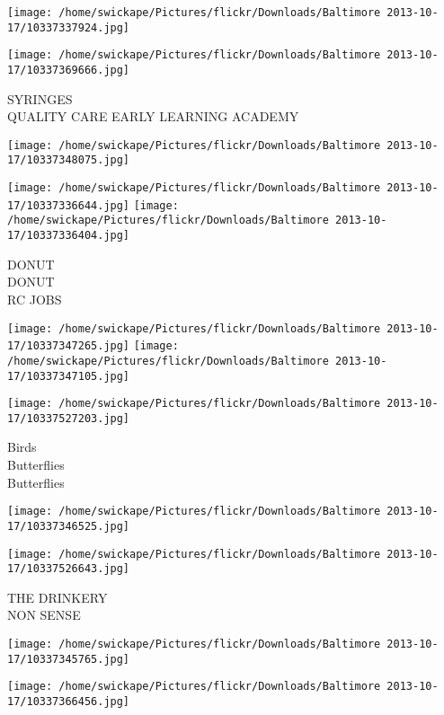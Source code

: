 \documentclass[10pt,letterpaper]{article}
\begin{document}
\texttt{[image: /home/swickape/Pictures/flickr/Downloads/Baltimore 2013-10-17/10337337924.jpg]}

\vspace{0.25in}
\texttt{[image: /home/swickape/Pictures/flickr/Downloads/Baltimore 2013-10-17/10337369666.jpg]}

SYRINGES\\
QUALITY CARE EARLY LEARNING ACADEMY\\
\pagebreak

\texttt{[image: /home/swickape/Pictures/flickr/Downloads/Baltimore 2013-10-17/10337348075.jpg]}

\vspace{0.25in}
\texttt{[image: /home/swickape/Pictures/flickr/Downloads/Baltimore 2013-10-17/10337336644.jpg]}
\texttt{[image: /home/swickape/Pictures/flickr/Downloads/Baltimore 2013-10-17/10337336404.jpg]}

DONUT\\
DONUT\\
RC JOBS\\
\pagebreak

\texttt{[image: /home/swickape/Pictures/flickr/Downloads/Baltimore 2013-10-17/10337347265.jpg]}
\texttt{[image: /home/swickape/Pictures/flickr/Downloads/Baltimore 2013-10-17/10337347105.jpg]}

\texttt{[image: /home/swickape/Pictures/flickr/Downloads/Baltimore 2013-10-17/10337527203.jpg]}

Birds\\
Butterflies\\
Butterflies\\
\pagebreak

\texttt{[image: /home/swickape/Pictures/flickr/Downloads/Baltimore 2013-10-17/10337346525.jpg]}

\vspace{0.25in}
\texttt{[image: /home/swickape/Pictures/flickr/Downloads/Baltimore 2013-10-17/10337526643.jpg]}

THE DRINKERY\\
NON SENSE\\
\pagebreak

\texttt{[image: /home/swickape/Pictures/flickr/Downloads/Baltimore 2013-10-17/10337345765.jpg]}

\vspace{0.25in}
\texttt{[image: /home/swickape/Pictures/flickr/Downloads/Baltimore 2013-10-17/10337366456.jpg]}
\end{document}

